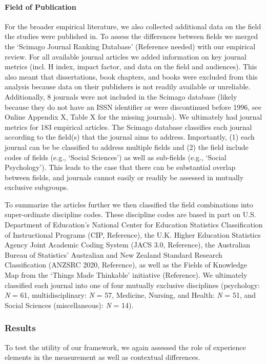 \documentclass[man, 12pt, a4paper]{apa7}
\begin{document}
\paragraph{Field of Publication} For the broader empirical literature, we also collected additional data on the field the studies were published in.  To assess the differences between fields we merged the `Scimago Journal Ranking Database' (Reference needed) with our empirical review. For all available journal articles we added information on key journal metrics (incl. H index, impact factor, and data on the field and audiences). This also meant that dissertations, book chapters, and books were excluded from this analysis because data on their publishers is not readily available or unreliable. Additionally, 8 journals were not included in the Scimago database (likely because they do not have an ISSN identifier or were discontinued before 1996, see Online Appendix X, Table X for the missing journals). We ultimately had journal metrics for 183 empirical articles. The Scimago database classifies each journal according to the field(s) that the journal aims to address. Importantly, (1) each journal can be be classified to address multiple fields and (2) the field include codes of fields (e.g., ‘Social Sciences’) as well as sub-fields (e.g., ‘Social Psychology’). This leads to the case that there can be substantial overlap between fields, and journals cannot easily or readily be assessed in mutually exclusive subgroups.

To summarize the articles further we then classified the field combinations into super-ordinate discipline codes. These discipline codes are based in part on U.S. Department of Education’s National Center for Education Statistics Classification of Instructional Programs (CIP, Reference), the U.K. Higher Education Statistics Agency Joint Academic Coding System (JACS 3.0, Reference), the Australian Bureau of Statistics’ Australian and New Zealand Standard Research Classification (ANZSRC 2020, Reference), as well as the Fields of Knowledge Map from the ‘Things Made Thinkable’ initiative (Reference). We ultimately classified each journal into one of four mutually exclusive disciplines (psychology: \textit{N} = 61, multidisciplinary: \textit{N} = 57, Medicine, Nursing, and Health: \textit{N} = 51, and Social Sciences (miscellaneous): \textit{N} = 14). 

\subsubsection{Results}
To test the utility of our framework, we again assessed the role of experience elements in the measurement as well as contextual differences.
\end{document}

